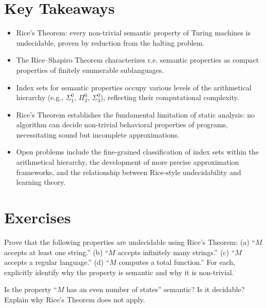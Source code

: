 \section*{Key Takeaways}
\begin{itemize}
\item Rice's Theorem: every non-trivial semantic property of Turing machines is undecidable, proven by reduction from the halting problem.
\item The Rice--Shapiro Theorem characterizes r.e. semantic properties as compact properties of finitely enumerable sublanguages.
\item Index sets for semantic properties occupy various levels of the arithmetical hierarchy (e.g., $\Sigma^0_1$, $\Pi^0_2$, $\Sigma^0_3$), reflecting their computational complexity.
\item Rice's Theorem establishes the fundamental limitation of static analysis: no algorithm can decide non-trivial behavioral properties of programs, necessitating sound but incomplete approximations.
\item Open problems include the fine-grained classification of index sets within the arithmetical hierarchy, the development of more precise approximation frameworks, and the relationship between Rice-style undecidability and learning theory.
\end{itemize}

\section{Exercises}
\label{sec:rice:exercises}

\begin{exercise}[Basic]
Prove that the following properties are undecidable using Rice's Theorem:
(a) ``$M$ accepts at least one string.''
(b) ``$M$ accepts infinitely many strings.''
(c) ``$M$ accepts a regular language.''
(d) ``$M$ computes a total function.''
For each, explicitly identify why the property is semantic and why it is non-trivial.
\end{exercise}

\begin{exercise}[Basic]
Is the property ``$M$ has an even number of states'' semantic? Is it decidable? Explain why Rice's Theorem does not apply.
\end{exercise}

